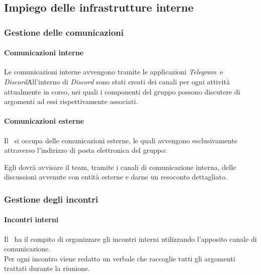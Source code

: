   \subsection{Impiego delle infrastrutture interne}

    \subsubsection{Gestione delle comunicazioni}
      \paragraph{Comunicazioni interne}
        Le comunicazioni interne avvengono tramite le applicazioni \textit{Telegram}\glo\ e \textit{Discord}\glo\. All'interno di \textit{Discord} sono stati creati dei canali per ogni attività attualmente in corso, nei quali i componenti del gruppo possono discutere di argomenti ad essi rispettivamente associati.
      
      \paragraph{Comunicazioni esterne}
        Il \roleProjectManager\ si occupa delle comunicazioni esterne, le quali avvengono esclusivamente attraverso l'indirizzo di posta elettronica del gruppo:\\
        \begin{center}
          \groupEmail
        \end{center}
        Egli dovrà avvisare il team, tramite i canali di comunicazione interna, delle discussioni avvenute con entità esterne e darne un resoconto dettagliato.

    \subsubsection{Gestione degli incontri}
      \paragraph{Incontri interni}
        Il \roleProjectManager\ ha il compito di organizzare gli incontri interni utilizzando l'apposito canale di comunicazione.\\
        Per ogni incontro viene redatto un verbale che raccoglie tutti gli argomenti trattati durante la riunione.

